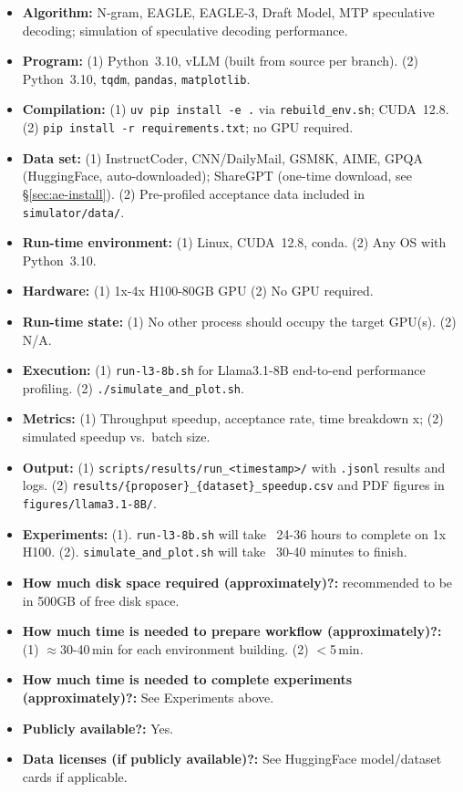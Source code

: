 \documentclass{article}
\begin{document}
{\small
\begin{itemize}
  \item {\bf Algorithm: } N-gram, EAGLE, EAGLE-3, Draft Model, MTP speculative decoding; simulation of speculative decoding performance.
  \item {\bf Program: } (1) Python~3.10, vLLM (built from source per branch). (2) Python~3.10, \texttt{tqdm}, \texttt{pandas}, \texttt{matplotlib}.
  \item {\bf Compilation: } (1) \texttt{uv pip install -e .} via \texttt{rebuild\_env.sh}; CUDA~12.8. (2) \texttt{pip install -r requirements.txt}; no GPU required.
  \item {\bf Data set: } (1) InstructCoder, CNN/DailyMail, GSM8K, AIME, GPQA (HuggingFace, auto-downloaded); ShareGPT (one-time download, see \S\ref{sec:ae-install}). (2) Pre-profiled acceptance data included in \texttt{simulator/data/}.
  \item {\bf Run-time environment: } (1) Linux, CUDA~12.8, conda. (2) Any OS with Python~3.10.
  \item {\bf Hardware: } (1) 1x-4x H100-80GB GPU (2) No GPU required.
  \item {\bf Run-time state: } (1) No other process should occupy the target GPU(s). (2) N/A.
  \item {\bf Execution: } (1) \texttt{run-l3-8b.sh} for Llama3.1-8B end-to-end performance profiling. (2) \texttt{./simulate\_and\_plot.sh}.
  \item {\bf Metrics: } (1) Throughput speedup, acceptance rate, time breakdown x; (2) simulated speedup vs.\ batch size.
  \item {\bf Output: } (1) \texttt{scripts/results/run\_<timestamp>/} with \texttt{.jsonl} results and logs. (2) \texttt{results/\{proposer\}\_\{dataset\}\_speedup.csv} and PDF figures in \texttt{figures/llama3.1-8B/}.
  \item {\bf Experiments: } (1). \texttt{run-l3-8b.sh} will take ~24-36 hours to complete on 1x H100. (2). \texttt{simulate\_and\_plot.sh} will take ~30-40 minutes to finish.
  \item {\bf How much disk space required (approximately)?: } recommended to be in 500GB of free disk space.
  \item {\bf How much time is needed to prepare workflow (approximately)?: } (1) $\approx$30-40\,min for each environment building. (2) $<$5\,min.
  \item {\bf How much time is needed to complete experiments (approximately)?: } See Experiments above.
  \item {\bf Publicly available?: } Yes.
  \item {\bf Data licenses (if publicly available)?: } See HuggingFace model/dataset cards if applicable.
\end{itemize}
}
\end{document}
